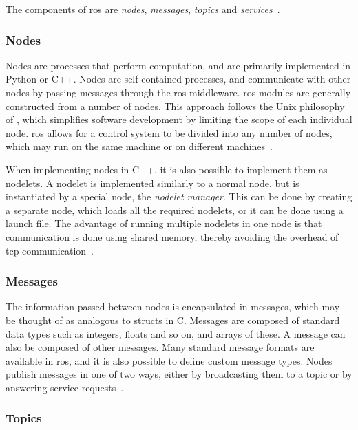 \documentclass[\rootfolder/main.tex]{subfiles}
\begin{document}
The components of \acrshort{ros} are \emph{nodes}, \emph{messages}, \emph{topics} and \emph{services}~\cite{Quigley2009}.

\subsubsection{Nodes}

Nodes are processes that perform computation, and are primarily implemented in Python or C++.
Nodes are self-contained processes, and communicate with other nodes by passing messages through the \acrshort{ros} middleware.
\acrshort{ros} modules are generally constructed from a number of nodes.
This approach follows the Unix philosophy of , which simplifies software development by limiting the scope of each individual node.
\acrshort{ros} allows for a control system to be divided into any number of nodes, which may run on the same machine or on different machines~\cite{ROS}.

When implementing nodes in C++, it is also possible to implement them as nodelets.
A nodelet is implemented similarly to a normal node, but is instantiated by a special node, the \emph{nodelet manager}.
This can be done by creating a separate node, which loads all the required nodelets, or it can be done using a launch file.
The advantage of running multiple nodelets in one node is that communication is done using shared memory, thereby avoiding the overhead of \acrshort{tcp} communication~\cite{Quigley2009}.

\subsubsection{Messages}

The information passed between nodes is encapsulated in messages, which may be thought of as analogous to structs in C.
Messages are composed of standard data types such as integers, floats and so on, and arrays of these.
A message can also be composed of other messages.
Many standard message formats are available in \acrshort{ros}, and it is also possible to define custom message types.
Nodes publish messages in one of two ways, either by broadcasting them to a topic or by answering service requests~\cite{Quigley2009}.

\subsubsection{Topics}
\end{document}
